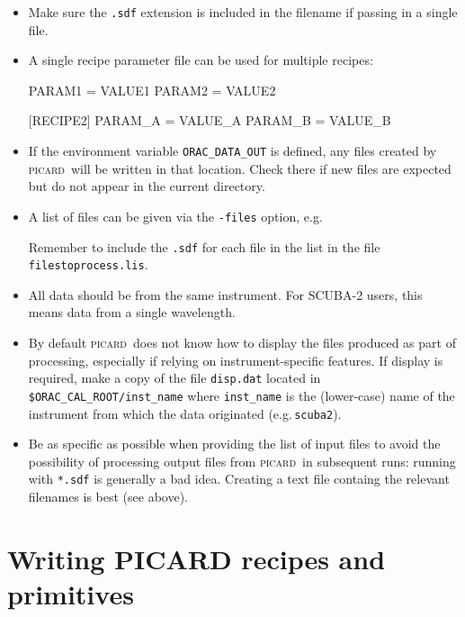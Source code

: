 \documentclass[twoside,11pt,nolof]{starlink}
\providecommand{\picard}{\textsc{picard}}
\begin{document}
\begin{itemize}

\item
Make sure the \verb+.sdf+ extension is included in the filename if
passing in a single file.

\item A single recipe parameter file can be used for multiple recipes:
\begin{terminalv}
[RECIPE1]
PARAM1 = VALUE1
PARAM2 = VALUE2

[RECIPE2]
PARAM_A = VALUE_A
PARAM_B = VALUE_B
\end{terminalv}

\item If the environment variable \verb+ORAC_DATA_OUT+ is defined, any
  files created by \picard\ will be written in that location. Check
  there if new files are expected but do not appear in the current
  directory.

\item A list of files can be given via the \texttt{-files} option, e.g.\
\begin{terminalv}
\end{terminalv}
Remember to include the \verb+.sdf+ for each file in the list in the
file \verb+filestoprocess.lis+.

\item All data should be from the same instrument. For SCUBA-2 users,
  this means data from a single wavelength.

\item By default \picard\ does not know how to display the files
  produced as part of processing, especially if relying on
  instrument-specific features. If display is required, make a copy of
  the file \texttt{disp.dat} located in
  \verb+$ORAC_CAL_ROOT/inst_name+ where \verb+inst_name+ is the
  (lower-case) name of the instrument from which the data originated
  (e.g.\,\verb+scuba2+).

\item Be as specific as possible when providing the list of input
  files to avoid the possibility of processing output files from
  \picard\ in subsequent runs: running with \verb+*.sdf+ is generally
  a bad idea. Creating a text file containg the relevant filenames is
  best (see above).

\end{itemize}

\section{Writing PICARD recipes and primitives\label{se:write}}
\end{document}
